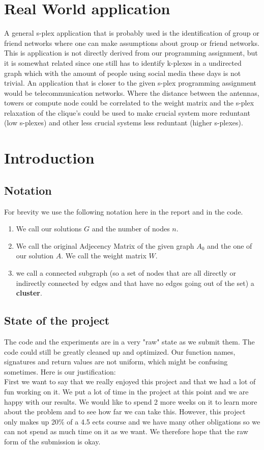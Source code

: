 \section{Real World application}

A general s-plex application that is probably used is the identification of group or friend networks
where one can make assumptions about group or friend networks. This is application is not directly
derived from our programming assignment, but it is somewhat related since one still has to identify k-plexes in a
undirected graph which with the amount of people using social media these days is not trivial.
An application that is closer to the given s-plex programming assignment would be telecommunication networks.
Where the distance between the antennas, towers or compute node could be correlated to the weight matrix and the s-plex
relaxation of the clique's could be used to make crucial system more reduntant (low s-plexes) and other less crucial systems
less reduntant (higher s-plexes).
\section{Introduction}
\subsection{Notation}
For brevity we use the following notation here in the report and in the code.
\begin{enumerate}
    \item We call our solutions $G$ and the number of nodes $n$.
    \item We call the original Adjecency Matrix of the given graph $A_0$ and the one of our solution $A$. We call the weight matrix $W$.
    \item we call a connected subgraph (so a set of nodes that are all directly or indirectly connected by edges and that have no edges going out of the set) a \textbf{cluster}.
\end{enumerate}

\subsection{State of the project}
The code and the experiments are in a very "raw" state as we submit them. The code could still be greatly cleaned up and optimized. Our function names, signatures and return values are not uniform, which might be confusing sometimes. Here is our justification:\\
First we want to say that we really enjoyed this project and that we had a lot of fun working on it. We put a lot of time in the project at this point and we are happy with our results. We would like to spend 2 more weeks on it to learn more about the problem and to see how far we can take this. However, this project only makes up 20\% of a 4.5 ects course and we have many other obligations so we can not spend as much time on it as we want. We therefore hope that the raw form of the submission is okay.\\

